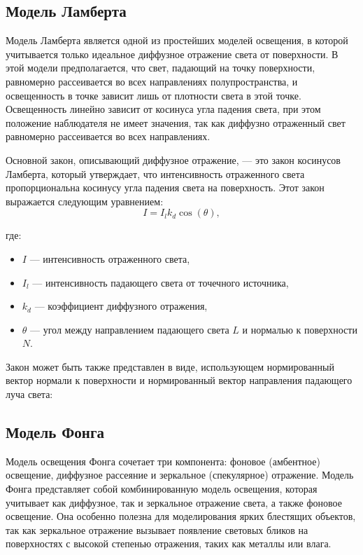 \subsection{Модель Ламберта}
Модель Ламберта является одной из простейших моделей освещения, в которой учитывается только идеальное диффузное отражение света от поверхности. В этой модели предполагается, что свет, падающий на точку поверхности, равномерно рассеивается во всех направлениях полупространства, и освещенность в точке зависит лишь от плотности света в этой точке. Освещенность линейно зависит от косинуса угла падения света, при этом положение наблюдателя не имеет значения, так как диффузно отраженный свет равномерно рассеивается во всех направлениях.

Основной закон, описывающий диффузное отражение, — это закон косинусов Ламберта, который утверждает, что интенсивность отраженного света пропорциональна косинусу угла падения света на поверхность. Этот закон выражается следующим уравнением:
\begin{equation}
	I = I_l k_d \cos(\theta),
\end{equation}

где:  
\begin{itemize}
	\item $I$ — интенсивность отраженного света,  
	\item $I_l$ — интенсивность падающего света от точечного источника,  
	\item $k_d$ — коэффициент диффузного отражения,  
	\item $\theta$ — угол между направлением падающего света $L$ и нормалью к поверхности $N$.  
\end{itemize}

Закон может быть также представлен в виде, использующем нормированный вектор нормали к поверхности и нормированный вектор направления падающего луча света:


\subsection{Модель Фонга}

Модель освещения Фонга сочетает три компонента: фоновое (амбентное) освещение, диффузное рассеяние и зеркальное (спекулярное) отражение.
Модель Фонга представляет собой комбинированную модель освещения, которая учитывает как диффузное, так и зеркальное отражение света, а также фоновое освещение. Она особенно полезна для моделирования ярких блестящих объектов, так как зеркальное отражение вызывает появление световых бликов на поверхностях с высокой степенью отражения, таких как металлы или влага.

